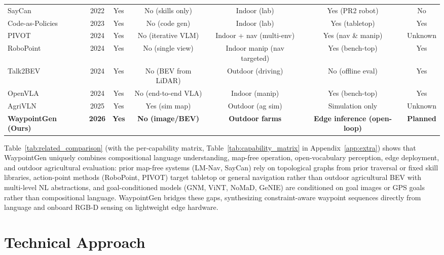 \documentclass{article}
\begin{document}
\begin{table}[t]
{\begin{tabular}{lcccccc}
SayCan~\citep{ichter2023saycan} & 2022 & Yes & No (skills only) & Indoor (lab) & Yes (PR2 robot) & No \\
Code-as-Policies~\citep{liang2023code} & 2023 & Yes & No (code gen) & Indoor (lab) & Yes (tabletop) & Yes \\
PIVOT~\citep{nasiriany2024pivot} & 2024 & Yes & No (iterative VLM) & Indoor + nav (multi-env) & Yes (nav \& manip) & Unknown \\
RoboPoint~\citep{yuan2025robopoint} & 2024 & Yes & No (single view) & Indoor manip (nav targeted) & Yes (bench-top) & Yes \\
Talk2BEV~\citep{choudhary2024talk2bev} & 2024 & Yes & No (BEV from LiDAR) & Outdoor (driving) & No (offline eval) & Yes \\
OpenVLA~\citep{kim2025openvla} & 2024 & Yes & No (end-to-end VLA) & Indoor (manip) & Yes (bench-top) & Yes \\
AgriVLN~\citep{zhao2025agrivln} & 2025 & Yes & Yes (sim map) & Outdoor (ag sim) & Simulation only & Unknown \\
\midrule
\textbf{WaypointGen (Ours)} & \textbf{2026} & \textbf{Yes} & \textbf{No (image/BEV)} & \textbf{Outdoor farms} & \textbf{Edge inference (open-loop)} & \textbf{Planned} \\
\bottomrule
\end{tabular}%
}
\end{table}
Table~\ref{tab:related_comparison} (with the per-capability matrix, Table~\ref{tab:capability_matrix} in Appendix~\ref{app:extra}) shows that WaypointGen uniquely combines compositional language understanding, map-free operation, open-vocabulary perception, edge deployment, and outdoor agricultural evaluation: prior map-free systems (LM-Nav, SayCan) rely on topological graphs from prior traversal or fixed skill libraries, action-point methods (RoboPoint, PIVOT) target tabletop or general navigation rather than outdoor agricultural BEV with multi-level NL abstractions, and goal-conditioned models (GNM, ViNT, NoMaD, GeNIE) are conditioned on goal images or GPS goals rather than compositional language. WaypointGen bridges these gaps, synthesizing constraint-aware waypoint sequences directly from language and onboard RGB-D sensing on lightweight edge hardware.

\section{Technical Approach}
\label{sec:approach}
\end{document}
